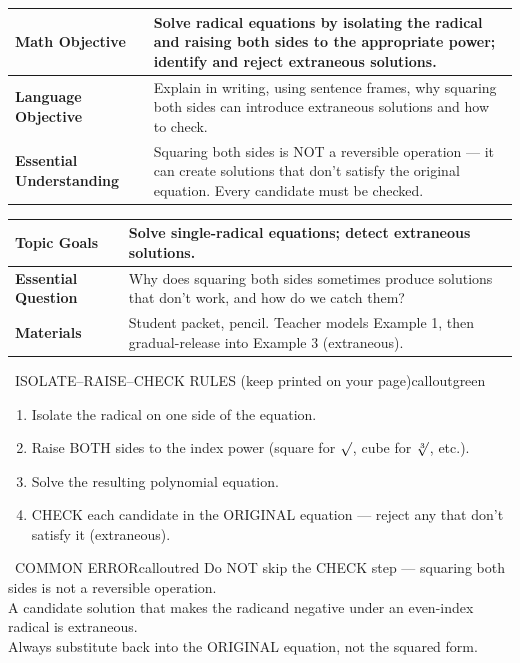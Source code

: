 \documentclass[11pt]{article}
\newcommand{\lessonrow}[2]{\textbf{#1} & #2 \\ \hline}
\begin{document}

{\small
\renewcommand{\arraystretch}{1.25}
\noindent\begin{tabular}{|p{1.8in}|p{4.8in}|}
\hline
\lessonrow{Math Objective}{Solve radical equations by isolating the radical and raising both sides to the appropriate power; identify and reject extraneous solutions.}
\lessonrow{Language Objective}{Explain in writing, using sentence frames, why squaring both sides can introduce extraneous solutions and how to check.}
\lessonrow{Essential Understanding}{Squaring both sides is NOT a reversible operation --- it can create solutions that don't satisfy the original equation. Every candidate must be checked.}
\end{tabular}
}

{\small
\renewcommand{\arraystretch}{1.25}
\noindent\begin{tabular}{|p{1.8in}|p{4.8in}|}
\hline
\lessonrow{Topic Goals}{Solve single-radical equations; detect extraneous solutions.}
\lessonrow{Essential Question}{Why does squaring both sides sometimes produce solutions that don't work, and how do we catch them?}
\lessonrow{Materials}{Student packet, pencil. Teacher models Example 1, then gradual-release into Example 3 (extraneous).}
\end{tabular}
}


\begin{callout}{\IconBook\ ISOLATE--RAISE--CHECK RULES (keep printed on your page)}{calloutgreen}
\begin{enumerate}[leftmargin=2.1em,itemsep=1pt,topsep=3pt]
  \item Isolate the radical on one side of the equation.
  \item Raise BOTH sides to the index power (square for \(\sqrt{\vphantom{x}}\), cube for \(\sqrt[3]{\vphantom{x}}\), etc.).
  \item Solve the resulting polynomial equation.
  \item CHECK each candidate in the ORIGINAL equation --- reject any that don't satisfy it (extraneous).
\end{enumerate}
\end{callout}

\begin{callout}{\IconWarn\ COMMON ERROR}{calloutred}
Do NOT skip the CHECK step --- squaring both sides is not a reversible operation.\\
A candidate solution that makes the radicand negative under an even-index radical is extraneous.\\
Always substitute back into the ORIGINAL equation, not the squared form.
\end{callout}
\end{document}
